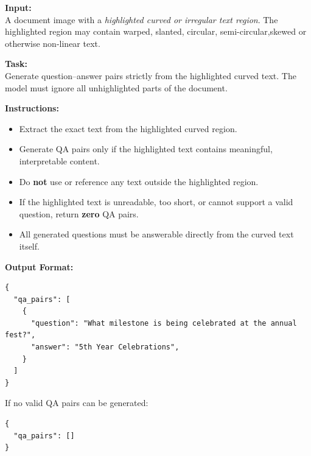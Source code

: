 \begin{tcolorbox}[prompt_procedural, title=Prompt for Curved Text Documents]

\textbf{Input:} \\
A document image with a \emph{highlighted curved or irregular text region}.  
The highlighted region may contain warped, slanted, circular, semi-circular,skewed or otherwise non-linear text.

\vspace{0.8em}

\textbf{Task:} \\
Generate question–answer pairs strictly from the highlighted curved text.  
The model must ignore all unhighlighted parts of the document.

\vspace{0.8em}

\textbf{Instructions:}
\begin{itemize}
    \item Extract the exact text from the highlighted curved region.
    \item Generate QA pairs only if the highlighted text contains meaningful, interpretable content.
    \item Do \textbf{not} use or reference any text outside the highlighted region.
    \item If the highlighted text is unreadable, too short, or cannot support a valid question, return \textbf{zero} QA pairs.
    \item All generated questions must be answerable directly from the curved text itself.
\end{itemize}

\vspace{0.8em}

\textbf{Output Format:}
\begin{verbatim}
{
  "qa_pairs": [
    {
      "question": "What milestone is being celebrated at the annual fest?",
      "answer": "5th Year Celebrations",
    }
  ]
}
\end{verbatim}

If no valid QA pairs can be generated:
\begin{verbatim}
{
  "qa_pairs": []
}
\end{verbatim}

\end{tcolorbox}
